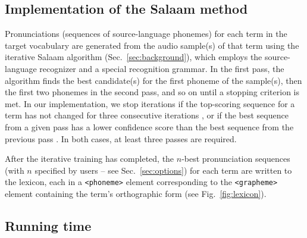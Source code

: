 \documentclass[11pt]{article}
\begin{document}
\subsection{Implementation of the Salaam method}
\label{sec:implementation}

Pronunciations (sequences of source-language phonemes) for each term in the target vocabulary are generated from the audio sample(s) of that term using the iterative Salaam algorithm %
(Sec.~\ref{sec:background}), which employs the source-language recognizer and a special recognition grammar. In the first pass, the algorithm finds the best candidate(s) for the first phoneme of the sample(s), then the first two phonemes in the second pass, and so on until a stopping criterion is met. 
In our implementation, 
we stop iterations
if the top-scoring sequence for a term has not changed for three consecutive iterations \cite{Chan12}, or 
if the best sequence from a given pass has a lower confidence score than the best sequence from the previous pass 
\cite{Qiao10}. In both cases, at least three passes are required.


After the iterative training has completed, the $n$-best pronunciation sequences (with $n$ specified by users -- see Sec.~\ref{sec:options}) for each term are written to the lexicon, each in a \texttt{<phoneme>} element corresponding to the \texttt{<grapheme>} element containing the term's orthographic form (see Fig.~\ref{fig:lexicon}).

\subsection{Running time}
\label{sec:runningtime}
\end{document}
